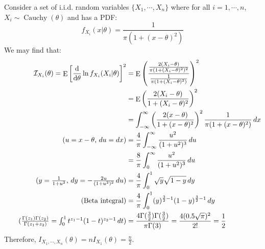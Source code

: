 \documentclass{huhtakm-template-book-v2}
\DeclareMathOperator{\E}{E}
\DeclareMathOperator{\Cauchy}{Cauchy}
\begin{document}
\begin{eg}
	Consider a set of i.i.d. random variables $\{X_{1},\cdots,X_{n}\}$ where for all $i=1,\cdots,n$, $X_{i}\sim\Cauchy(\theta)$ and has a PDF:
	\begin{equation*}
		f_{X_{i}}(x|\theta)=\frac{1}{\pi(1+(x-\theta)^{2})}
	\end{equation*}
	We may find that:
	\begin{align*}
		\mathcal{I}_{X_{i}}(\theta)=\E\left[\odv*{}{\theta}\ln{f_{X_{i}}(X_{i}|\theta)}\right]^{2}&=\E\left(\frac{\frac{2(X_{i}-\theta)}{\pi(1+(X_{i}-\theta)^{2})^{2}}}{\frac{1}{\pi(1+(X_{i}-\theta)^{2})}}\right)^{2}\\
		&=\E\left(\frac{2(X_{i}-\theta)}{1+(X_{i}-\theta)^{2}}\right)^{2}\\
		&=\intinfty\left(\frac{2(x-\theta)}{1+(x-\theta)^{2}}\right)^{2}\frac{1}{\pi(1+(x-\theta)^{2})}\,dx\\
		\tag{$u=x-\theta$, $du=dx$}
		&=\frac{4}{\pi}\intinfty\frac{u^{2}}{(1+u^{2})^{3}}\,du\\
		&=\frac{8}{\pi}\int_{0}^{\infty}\frac{u^{2}}{(1+u^{2})^{3}}\,du\\
		\tag{$y=\frac{1}{1+u^{2}}$, $dy=-\frac{2u}{(1+u^{2})^{2}}\,du$}
		&=\frac{4}{\pi}\int_{0}^{1}\sqrt{y}\sqrt{1-y}\,dy\\
		\tag{Beta integral}
		&=\frac{4}{\pi}\int_{0}^{1}(y)^{\frac{3}{2}-1}(1-y)^{\frac{3}{2}-1}\,dy\\
		\tag{$\frac{\Gamma(z_{1})\Gamma(z_{2})}{\Gamma(z_{1}+z_{2})}=\int_{0}^{1}t^{z_{1}-1}(1-t)^{z_{2}-1}\,dt$}
		&=\frac{4\Gamma(\frac{3}{2})\Gamma(\frac{3}{2})}{\pi\Gamma(3)}=\frac{4(0.5\sqrt{\pi})^{2}}{2!}=\frac{1}{2}
	\end{align*}
	Therefore, $I_{X_{1},\cdots,X_{n}}(\theta)=nI_{X_{1}}(\theta)=\frac{n}{2}$.
\end{eg}
\end{document}
